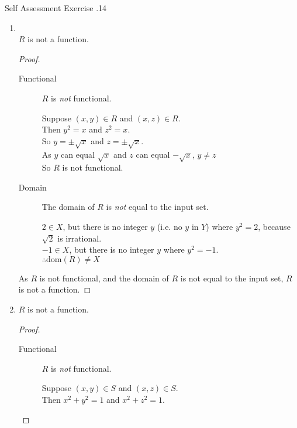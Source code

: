 \documentclass[../notes.tex]{subfiles}
\begin{document}
\begin{exercise}{Self Assessment Exercise \thechapter.14}
\begin{enumerate}
\begin{enumerate}[label=(\alph*)]
\begin{proof}
									\end{proof}
								\item {}\\
									$R$ is not a function.
									\begin{proof}
										$ $
										\begin{description}
											\item[Functional] $R$ is \emph{not} functional.
												\begin{subproof}[Subproof]
													Suppose $(x, y) \in R$ and $(x, z) \in R$.\\
													Then $y^{2} = x$ and $z^{2} = x$.\\
													So $y = \pm \sqrt{x}$ and $z = \pm \sqrt{x}$.\\
													As $y$ can equal $\sqrt{x}$ and $z$ can equal $- \sqrt{x}$, $y \neq z$\\
													So $R$ is not functional.
												\end{subproof}
											\item[Domain] The domain of $R$ is \emph{not} equal to the input set.
												\begin{subproof}[Counterexample]
													$2 \in X$, but there is no integer $y$ (i.e. no $y$ in $Y$) where $y^{2} = 2$, because $\sqrt{2}$ is irrational.\\
													$-1 \in X$, but there is no integer $y$ where $y^{2} = -1$.\\
													$\therefore \mathrm{dom}(R) \neq X$ 
												\end{subproof}
										\end{description}
										As $R$ is not functional, and the domain of $R$ is not equal to the input set, $R$ is not a function.
									\end{proof}
								\pagebreak
								\item {}
									$R$ is not a function.
									\begin{proof}
										$ $
										\begin{description}
											\item[Functional] $R$ is \emph{not} functional.
												\begin{subproof}[Subproof]
													Suppose $(x, y) \in S$ and $(x, z) \in S$.\\
													Then $x^{2} + y^{2} = 1$ and $x^{2} + z^{2} = 1$.\\

\end{subproof}
\end{description}
\end{proof}
\end{enumerate}
\end{enumerate}
\end{exercise}
\end{document}
